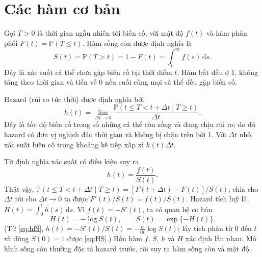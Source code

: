 \documentclass[11pt,a4paper,notitlepage]{report}
\newcommand{\Prob}{\mathbb{P}}
\newcommand{\dd}{\,\mathrm{d}}
\newcommand{\bs}[1]{\textcolor{bsblue}{#1}}
\begin{document}
\section{Các hàm cơ bản}

Gọi $T>0$ là thời gian ngẫu nhiên tới biến cố, với mật độ $f(t)$ và hàm phân phối $F(t)=\Prob(T\le t)$.
Hàm sống còn được định nghĩa là
\begin{equation}
S(t)=\Prob(T>t)=1-F(t)=\int_t^\infty f(s)\dd s.
\end{equation}
Đây là xác suất cá thể chưa gặp biến cố tại thời điểm $t$. Hàm bắt đầu ở 1, không tăng theo thời
gian và tiến về 0 nếu cuối cùng mọi cá thể đều gặp biến cố.

Hazard (rủi ro tức thời) được định nghĩa bởi
\begin{equation}
h(t)=\lim_{\Delta t\to0}\frac{\Prob(t\le T<t+\Delta t\mid T\ge t)}{\Delta t}.
\end{equation}
Đây là tốc độ biến cố trong số những cá thể còn sống và đang chịu rủi ro; do đó hazard có đơn vị
nghịch đảo thời gian và không bị chặn trên bởi 1. Với $\Delta t$ nhỏ, xác suất biến cố trong khoảng kế
tiếp xấp xỉ $h(t)\Delta t$.

Từ định nghĩa xác suất có điều kiện suy ra
\begin{equation}\label{eq:hfS}
h(t)=\frac{f(t)}{S(t)}.
\end{equation}
\bs{Thật vậy, $\Prob(t\le T<t+\Delta t\mid T\ge t)=[F(t+\Delta t)-F(t)]/S(t)$; chia cho $\Delta t$ rồi cho $\Delta t\to0$ ta được $F'(t)/S(t)=f(t)/S(t)$.}
Hazard tích luỹ là $H(t)=\int_0^t h(s)\dd s$. Vì $f(t)=-S'(t)$, ta có quan hệ cơ bản
\begin{equation}\label{eq:HS}
H(t)=-\log S(t),\qquad S(t)=\exp\{-H(t)\}.
\end{equation}
\bs{(Từ \eqref{eq:hfS}, $h(t)=-S'(t)/S(t)=-\tfrac{\mathrm d}{\mathrm dt}\log S(t)$; lấy tích phân từ 0 đến $t$ và dùng $S(0)=1$ được \eqref{eq:HS}.)}
Bốn hàm $f$, $S$, $h$ và $H$ xác định lẫn nhau. Mô hình sống còn thường đặc tả hazard trước, rồi suy
ra hàm sống còn và mật độ.
\end{document}
